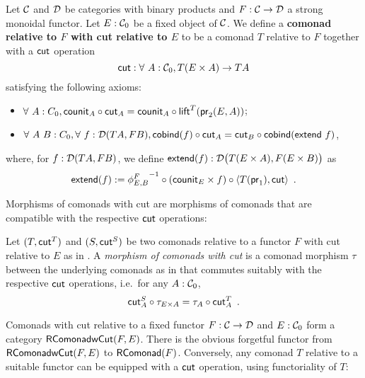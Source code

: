 \documentclass{amsart}
\newcommand{\fat}[1]{\textbf{#1}}
\begin{document}
\begin{definition}\label{def:rel_comonad_with_cut}
 Let $\C$ and $\D$ be categories with binary products and $F:\C\to\D$ a strong monoidal functor. Let $E:\C_0$ be a fixed object of $\C$.
 We define a \fat{comonad relative to $F$ with cut relative to $E$} to be a comonad $T$ relative to $F$ together with a $\cut$ operation 
    \[ \cut : \forall~A:\C_0, T(E\times A) \to TA \]
 satisfying the following axioms:
  \begin{itemize}
   \item $\forall~A:C_0, \comp{\cut_A}{\counit_A} = \comp{\lift^T(\pr_2(E,A))}{\counit_{A}}$;
   \item $\forall~A~B:C_0,\forall~f:\D(TA,FB), \comp{\cut_A}{\cobind(f)} = \comp{\cobind(\extend~f)}{\cut_B}$,
  \end{itemize}

  \noindent
  where, for $f:\D(TA,FB)$, we define $\extend(f) : \D\bigl(T(E\times A),F(E\times B)\bigr)$ as
       \[ \extend(f) := \comp{\comp{\langle T(\pr_1) , \cut \rangle}{(\counit_E\times f)}}{{\phi^{F}_{E,B}}^{-1}} \enspace . \]
  
\end{definition}

Morphisms of comonads with cut are morphisms of comonads that are compatible with the respective $\cut$ operations:

\begin{definition}\label{def:morphism_comonad_cut}
 Let $(T,\cut^T)$ and $(S,\cut^S)$ be two comonads relative to a functor $F$ with cut relative to $E$ as in .
 A \emph{morphism of comonads with cut} is a comonad morphism $\tau$ between the underlying comonads as in  that 
 commutes suitably with the respective $\cut$ operations, i.e.\ for any $A : \C_0$,
  \[ \comp{\tau_{E \times A}}{\cut^S_A}  = \comp{\cut^T_A}{\tau_A} \enspace . \]
\end{definition}


Comonads with cut relative to a fixed functor $F:\C\to\D$ and $E:\C_0$ form a category $\RComonadWC(F,E)$.
There is the obvious forgetful functor from $\RComonadWC(F,E)$ to $\RComonad(F)$.
Conversely, any comonad $T$ relative to a suitable functor can be equipped with a $\cut$ operation, using functoriality of $T$:
\end{document}
